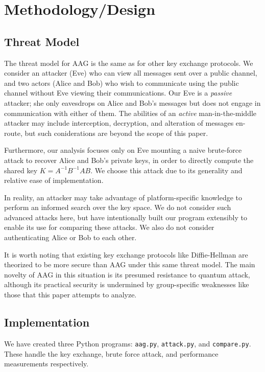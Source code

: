 \section{Methodology/Design}
\label{sec:methodology}

\subsection{Threat Model}
The threat model for AAG is the same as for other key exchange protocols. We consider an attacker (Eve) who can view all messages sent over a public channel, and two actors (Alice and Bob) who wish to communicate using the public channel without Eve viewing their communications. Our Eve is a \emph{passive} attacker; she only eavesdrops on Alice and Bob's messages but does not engage in communication with either of them. The abilities of an \textit{active} man-in-the-middle attacker may include interception, decryption, and alteration of messages en-route, but such coniderations are beyond the scope of this paper.

Furthermore, our analysis focuses only on Eve mounting a naive brute-force attack to recover Alice and Bob's private keys, in order to directly compute the shared key $K = A^{-1}B^{-1}AB$. We choose this attack due to its generality and relative ease of implementation. 

In reality, an attacker may take advantage of platform-specific knowledge to perform an informed search over the key space. We do not consider such advanced attacks here, but have intentionally built our program extensibly to enable its use for comparing these attacks. We also do not consider authenticating Alice or Bob to each other.

It is worth noting that existing key exchange protocols like Diffie-Hellman are theorized to be more secure than AAG under this same threat model. The main novelty of AAG in this situation is its presumed resistance to quantum attack, although its practical security is undermined by group-specific weaknesses like those that this paper attempts to analyze.

\subsection{Implementation}\label{sec:impl}

We have created three Python programs: \texttt{aag.py}, \texttt{attack.py}, and \texttt{compare.py}. These handle the key exchange, brute force attack, and performance measurements respectively.

